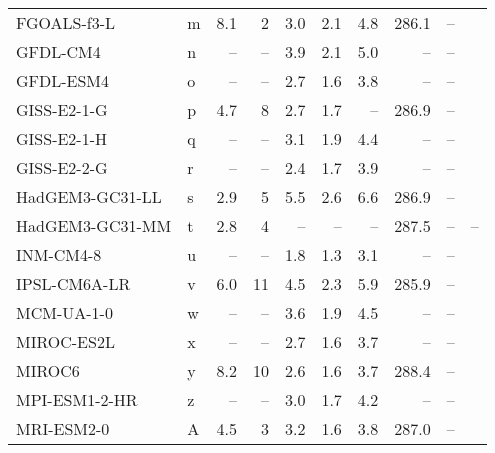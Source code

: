 \begin{table}
\begin{tabular}{llrrrrrrrl}
FGOALS-f3-L     &   m &   8.1 &                       2 &  3.0 &  2.1 &   4.8 &  286.1 &                   -- &  \citet{ringer20cmip} \\
GFDL-CM4        &   n &    -- &                    -- &  3.9 &  2.1 &   5.0 &     -- &                   -- &  \citet{ringer20cmip} \\
GFDL-ESM4       &   o &    -- &                    -- &  2.7 &  1.6 &   3.8 &     -- &                   -- &  \citet{ringer20cmip} \\
GISS-E2-1-G     &   p &   4.7 &                       8 &  2.7 &  1.7 &    -- &  286.9 &                   -- &  \citet{ringer20cmip} \\
GISS-E2-1-H     &   q &    -- &                    -- &  3.1 &  1.9 &   4.4 &     -- &                   -- &  \citet{ringer20cmip} \\
GISS-E2-2-G     &   r &    -- &                    -- &  2.4 &  1.7 &   3.9 &     -- &                   -- &  \citet{ringer20cmip} \\
HadGEM3-GC31-LL &   s &   2.9 &                       5 &  5.5 &  2.6 &   6.6 &  286.9 &                   -- &  \citet{ringer20cmip} \\
HadGEM3-GC31-MM &   t &   2.8 &                       4 &   -- &   -- &    -- &  287.5 &                   -- &                    -- \\
INM-CM4-8       &   u &    -- &                    -- &  1.8 &  1.3 &   3.1 &     -- &                   -- &  \citet{ringer20cmip} \\
IPSL-CM6A-LR    &   v &   6.0 &                      11 &  4.5 &  2.3 &   5.9 &  285.9 &                   -- &  \citet{ringer20cmip} \\
MCM-UA-1-0      &   w &    -- &                    -- &  3.6 &  1.9 &   4.5 &     -- &                   -- &  \citet{ringer20cmip} \\
MIROC-ES2L      &   x &    -- &                    -- &  2.7 &  1.6 &   3.7 &     -- &                   -- &  \citet{ringer20cmip} \\
MIROC6          &   y &   8.2 &                      10 &  2.6 &  1.6 &   3.7 &  288.4 &                   -- &  \citet{ringer20cmip} \\
MPI-ESM1-2-HR   &   z &    -- &                    -- &  3.0 &  1.7 &   4.2 &     -- &                   -- &  \citet{ringer20cmip} \\
MRI-ESM2-0      &   A &   4.5 &                       3 &  3.2 &  1.6 &   3.8 &  287.0 &                   -- &  \citet{ringer20cmip} \\

\end{tabular}
\end{table}
